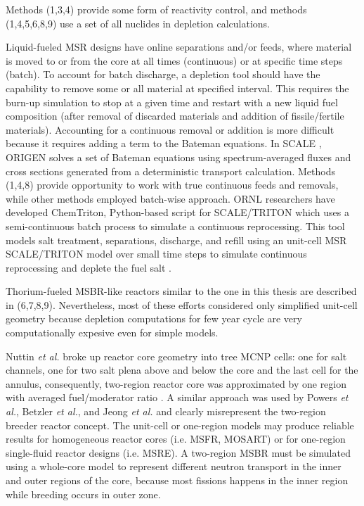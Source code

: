 Methods (1,3,4) provide some form of reactivity control, and methods (1,4,5,6,8,9) use a set of all nuclides in depletion calculations. 

Liquid-fueled \gls{MSR} designs have online separations and/or feeds, where material is moved to or from the core at all times (continuous) or at specific time steps (batch). To account for batch discharge, a depletion tool should have the capability to remove some or all material at specified interval. This requires the burn-up simulation to stop at a given time and restart with a new liquid fuel composition (after removal of discarded materials and addition of fissile/fertile materials). Accounting for a continuous removal or addition is more difficult because it requires adding a term to the Bateman equations. In SCALE \cite{bowman_scale_2011}, ORIGEN \cite{gauld_isotopic_2011} solves a set of Bateman equations using spectrum-averaged fluxes and cross sections generated from a deterministic transport calculation. Methods (1,4,8) provide opportunity to work with true continuous feeds and removals, while other methods employed batch-wise approach. \gls{ORNL} researchers have developed ChemTriton, Python-based script for SCALE/TRITON which uses a semi-continuous batch process to simulate a continuous reprocessing. This tool models salt treatment, separations, discharge, and refill using an unit-cell \gls{MSR} SCALE/TRITON model over small time steps to simulate continuous reprocessing and deplete the fuel salt \cite{powers_new_2013}.

Thorium-fueled \gls{MSBR}-like reactors similar to the one in this thesis are described in (6,7,8,9). Nevertheless, most of these efforts considered only simplified unit-cell geometry because depletion computations for few year cycle are very computationally expesive even for simple models. 

Nuttin \emph{et al.} broke up reactor core geometry into tree \gls{MCNP} cells: one for salt channels, one for two salt plena above and below the core and the last cell for the annulus, consequently, two-region reactor core was approximated by one region with averaged fuel/moderator ratio \cite{nuttin_potential_2005}.  A similar approach was used by Powers \emph{et al.}, Betzler \emph{et al.}, and Jeong \emph{et al.} \cite{powers_new_2013,powers_inventory_2014,betzler_modeling_2016, betzler_molten_2017, jeong_development_2014, jeong_equilibrium_2016} and clearly misrepresent the two-region breeder reactor concept. The unit-cell or one-region models may produce reliable results for homogeneous reactor cores (i.e. \gls{MSFR}, \gls{MOSART}) or for one-region single-fluid reactor designs (i.e. \gls{MSRE}). A two-region \gls{MSBR} must be simulated using a whole-core model to represent different neutron transport in the inner and outer regions of the core, because most fissions happens in the inner region while breeding occurs in outer zone.  

